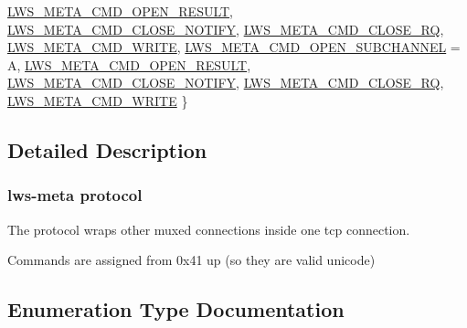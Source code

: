 \begin{DoxyCompactItemize}
\hyperlink{group__lwsmeta_gga6fbab5a2f1a1ef7af39af745e0b4a4feaf9bac70d7ab4bab06adeb9e03f5cc344}{L\+W\+S\+\_\+\+M\+E\+T\+A\+\_\+\+C\+M\+D\+\_\+\+O\+P\+E\+N\+\_\+\+R\+E\+S\+U\+LT}, 
\hyperlink{group__lwsmeta_gga6fbab5a2f1a1ef7af39af745e0b4a4fea38a291a2d858ee6dae1790ee19774d38}{L\+W\+S\+\_\+\+M\+E\+T\+A\+\_\+\+C\+M\+D\+\_\+\+C\+L\+O\+S\+E\+\_\+\+N\+O\+T\+I\+FY}, 
\hyperlink{group__lwsmeta_gga6fbab5a2f1a1ef7af39af745e0b4a4fea4a50e4fe1e50bbc8f2ff7bbda042c1aa}{L\+W\+S\+\_\+\+M\+E\+T\+A\+\_\+\+C\+M\+D\+\_\+\+C\+L\+O\+S\+E\+\_\+\+RQ}, 
\newline
\hyperlink{group__lwsmeta_gga6fbab5a2f1a1ef7af39af745e0b4a4fea6d0b758b0209f52c3dd8b262585cf850}{L\+W\+S\+\_\+\+M\+E\+T\+A\+\_\+\+C\+M\+D\+\_\+\+W\+R\+I\+TE}, 
\hyperlink{group__lwsmeta_gga6fbab5a2f1a1ef7af39af745e0b4a4fea36639b9c84a4eae74691be4c402d89c9}{L\+W\+S\+\_\+\+M\+E\+T\+A\+\_\+\+C\+M\+D\+\_\+\+O\+P\+E\+N\+\_\+\+S\+U\+B\+C\+H\+A\+N\+N\+EL} = \textquotesingle{}A\textquotesingle{}, 
\hyperlink{group__lwsmeta_gga6fbab5a2f1a1ef7af39af745e0b4a4feaf9bac70d7ab4bab06adeb9e03f5cc344}{L\+W\+S\+\_\+\+M\+E\+T\+A\+\_\+\+C\+M\+D\+\_\+\+O\+P\+E\+N\+\_\+\+R\+E\+S\+U\+LT}, 
\hyperlink{group__lwsmeta_gga6fbab5a2f1a1ef7af39af745e0b4a4fea38a291a2d858ee6dae1790ee19774d38}{L\+W\+S\+\_\+\+M\+E\+T\+A\+\_\+\+C\+M\+D\+\_\+\+C\+L\+O\+S\+E\+\_\+\+N\+O\+T\+I\+FY}, 
\newline
\hyperlink{group__lwsmeta_gga6fbab5a2f1a1ef7af39af745e0b4a4fea4a50e4fe1e50bbc8f2ff7bbda042c1aa}{L\+W\+S\+\_\+\+M\+E\+T\+A\+\_\+\+C\+M\+D\+\_\+\+C\+L\+O\+S\+E\+\_\+\+RQ}, 
\hyperlink{group__lwsmeta_gga6fbab5a2f1a1ef7af39af745e0b4a4fea6d0b758b0209f52c3dd8b262585cf850}{L\+W\+S\+\_\+\+M\+E\+T\+A\+\_\+\+C\+M\+D\+\_\+\+W\+R\+I\+TE}
 \}
\end{DoxyCompactItemize}


\subsection{Detailed Description}
\subsubsection*{lws-\/meta protocol}

The protocol wraps other muxed connections inside one tcp connection.

Commands are assigned from 0x41 up (so they are valid unicode) 

\subsection{Enumeration Type Documentation}
\mbox{\label{group__lwsmeta_ga6fbab5a2f1a1ef7af39af745e0b4a4fe}} 
